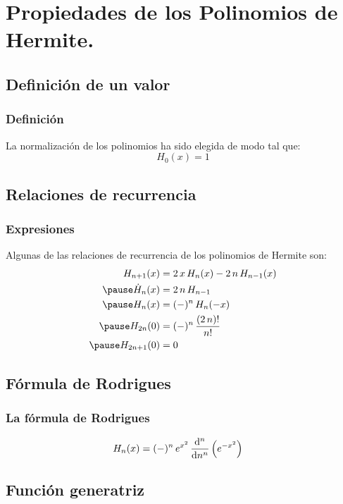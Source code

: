\documentclass[12pt]{beamer}
\begin{document}
\section{Propiedades de los Polinomios de Hermite.}
\subsection{Definición de un valor}

\begin{frame}
\frametitle{Definición}
La normalización de los polinomios ha sido elegida de modo tal que:
\pause
\[ H_{0}(x) = 1\]
\end{frame}

\subsection{Relaciones de recurrencia}

\begin{frame}
\frametitle{Expresiones}
Algunas de las relaciones de recurrencia de los polinomios de Hermite son:
\pause
\begin{eqnarray*}
\begin{aligned}
H_{n+1} (x) &= 2 \, x \, H_{n} (x) - 2 \, n \, H_{n-1} (x) \\ \pause
\dot{H}_{n} (x) &= 2 \, n \, H_{n-1} \\ \pause
H_{n} (x) &= (-)^{n} \, H_{n} (-x) \\ \pause
H_{2n} (0) &= (-)^{n} \, \dfrac{(2 \, n)!}{n!} \\ \pause
H_{2n+1} (0) &= 0
\end{aligned}
\end{eqnarray*}
\end{frame}

\subsection{Fórmula de Rodrigues}

\begin{frame}
\frametitle{La fórmula de Rodrigues}
\begin{align*}
H_{n} (x) &= (-)^{n} \, e^{x^{2}} \, \dv[n]{n} \left( e^{-x^{2}} \right)
\end{align*}
\end{frame}

\subsection{Función generatriz}
\end{document}
